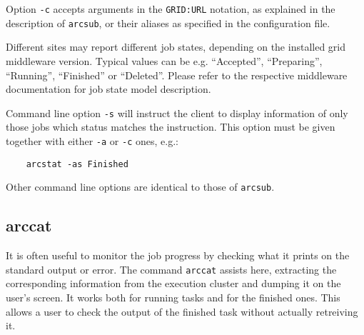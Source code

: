 Option \verb#-c# accepts arguments in the \texttt{GRID:URL} notation,
as explained in the description of \texttt{arcsub}, or their aliases as 
specified in the configuration file.

Different sites may report different job states, depending on
the installed grid middleware version. Typical values can be e.g. 
``Accepted'', ``Preparing'', ``Running'', ``Finished'' or ``Deleted''.
Please refer to the respective middleware documentation for job state model
description.

Command line option \verb#-s# will instruct the client to display information
of only those jobs which status matches the instruction. This option must be given
together with either \verb#-a# or \verb#-c# ones, e.g.:
\begin{verbatim}
    arcstat -as Finished
\end{verbatim}

Other command line options are identical to those of \verb#arcsub#.

\subsection{arccat}
\label{sec:arccat}

It is often useful to monitor the job progress by checking what it
prints on the standard output or error. The command \texttt{arccat}
 assists here, extracting the
corresponding information from the execution cluster and dumping it
on the user's screen. It works both for running tasks and for the
finished ones. This allows a user to check the output of the
finished task without actually retreiving it.

